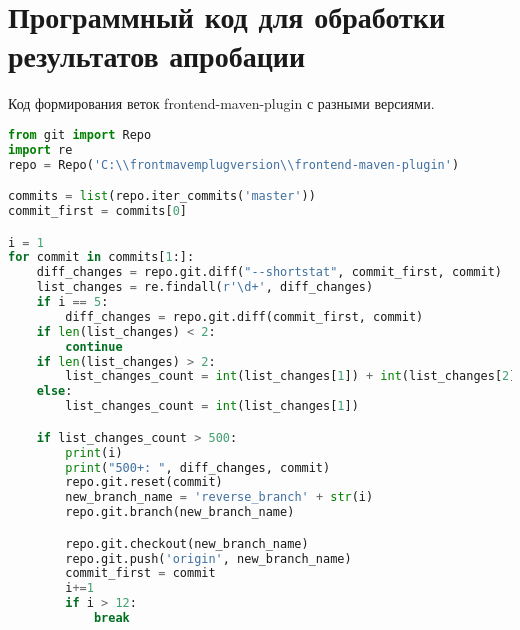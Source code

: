 \chapter{Программный код для обработки результатов апробации}\label{appendix-extra-examples}

Код формирования веток frontend-maven-plugin с разными версиями.

\begin{lstlisting}[language=Python]
from git import Repo
import re
repo = Repo('C:\\frontmavemplugversion\\frontend-maven-plugin')

commits = list(repo.iter_commits('master'))
commit_first = commits[0]

i = 1
for commit in commits[1:]:
    diff_changes = repo.git.diff("--shortstat", commit_first, commit)
    list_changes = re.findall(r'\d+', diff_changes)
    if i == 5:
        diff_changes = repo.git.diff(commit_first, commit)
    if len(list_changes) < 2:
        continue
    if len(list_changes) > 2:
        list_changes_count = int(list_changes[1]) + int(list_changes[2])
    else:
        list_changes_count = int(list_changes[1])

    if list_changes_count > 500:
        print(i)
        print("500+: ", diff_changes, commit)
        repo.git.reset(commit)
        new_branch_name = 'reverse_branch' + str(i)
        repo.git.branch(new_branch_name)

        repo.git.checkout(new_branch_name)
        repo.git.push('origin', new_branch_name)
        commit_first = commit
        i+=1
        if i > 12:
            break
   
\end{lstlisting}


